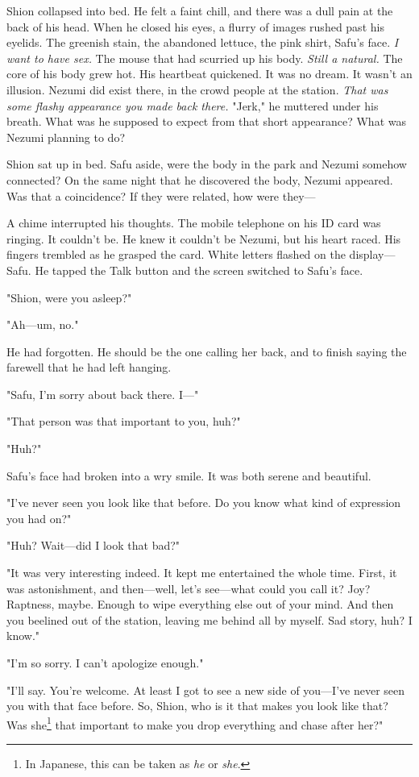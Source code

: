 Shion collapsed into bed. He felt a faint chill, and there was a dull
pain at the back of his head. When he closed his eyes, a flurry of
images rushed past his eyelids. The greenish stain, the abandoned
lettuce, the pink shirt, Safu's face. \emph{I want to have sex.} The mouse that
had scurried up his body. \emph{Still a natural.} The core of his body grew
hot. His heartbeat quickened. It was no dream. It wasn't an illusion.
Nezumi did exist there, in the crowd people at the station. \emph{That was
some flashy appearance you made back there.} "Jerk," he muttered under
his breath. What was he supposed to expect from that short appearance?
What was Nezumi planning to do?

Shion sat up in bed. Safu aside, were the body in the park and Nezumi
somehow connected? On the same night that he discovered the body, Nezumi
appeared. Was that a coincidence? If they were related, how were they---

A chime interrupted his thoughts. The mobile telephone on his ID card
was ringing. It couldn't be. He knew it couldn't be Nezumi, but his
heart raced. His fingers trembled as he grasped the card. White letters
flashed on the display---Safu. He tapped the Talk button and the screen
switched to Safu's face.

"Shion, were you asleep?"

"Ah---um, no."

He had forgotten. He should be the one calling her back, and to finish
saying the farewell that he had left hanging.

"Safu, I'm sorry about back there. I---"

"That person was that important to you, huh?"

"Huh?"

Safu's face had broken into a wry smile. It was both serene and
beautiful.

"I've never seen you look like that before. Do you know what kind of
expression you had on?"

"Huh? Wait---did I look that bad?"

"It was very interesting indeed. It kept me entertained the whole time.
First, it was astonishment, and then---well, let's see---what could you call
it? Joy? Raptness, maybe. Enough to wipe everything else out of your
mind. And then you beelined out of the station, leaving me behind all by
myself. Sad story, huh? I know."

"I'm so sorry. I can't apologize enough."

"I'll say. You're welcome. At least I got to see a new side of you---I've
never seen you with that face before. So, Shion, who is it that makes
you look like that? Was she\footnote{In Japanese, this can be taken as \emph{he} or \emph{she}.} that important to make you drop everything
and chase after her?"

